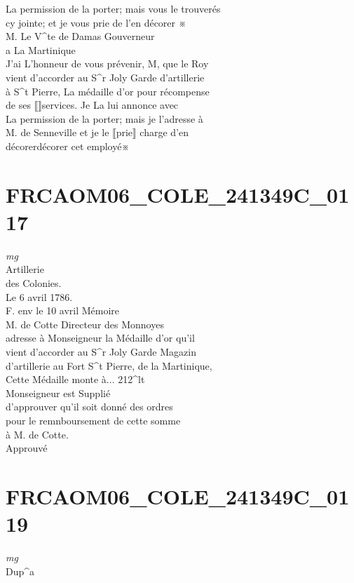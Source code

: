 \documentclass{article}
\begin{document}
\begin{pages}
La permission de la porter; mais vous le trouverés\\
cy jointe; et je vous prie de l'en décorer ※\\
M. Le V\^{}te de Damas Gouverneur\\
a La Martinique\\
J'ai L'honneur de vous prévenir, M, que le Roy\\
vient d'accorder au S\^{}r Joly Garde d'artillerie\\
à S\^{}t Pierre, La médaille d'or pour récompense\\
de ses ⟦⟧services. Je La lui annonce avec\\
La permission de la porter; mais je l'adresse à\\
M. de Senneville et je le ⟦prie⟧ charge d'en\\
décorerdécorer cet employé※
\pend
\endnumbering\beginnumbering\section{FRCAOM06\_COLE\_241349C\_0117}
\vspace{0.5cm}\noindent
\textit{mg}
\footnotesize \\
Artillerie\\
des Colonies.\\
Le 6 avril 1786.\\
F. env le 10 avril
\normalsize \pstart
Mémoire\\
M. de Cotte Directeur des Monnoyes\\
adresse à Monseigneur la Médaille d'or qu'il\\
vient d'accorder au S\^{}r Joly Garde Magazin\\
d'artillerie au Fort S\^{}t Pierre, de la Martinique,\\
Cette Médaille monte à... 212\^{}lt\\
Monseigneur est Supplié\\
d'approuver qu'il soit donné des ordres\\
pour le remnboursement de cette somme\\
à M. de Cotte.\\
Approuvé
\pend
\endnumbering\beginnumbering\section{FRCAOM06\_COLE\_241349C\_0119}
\vspace{0.5cm}\noindent
\textit{mg}
\footnotesize \\
Dup\^{}a\\

\end{pages}
\end{document}
